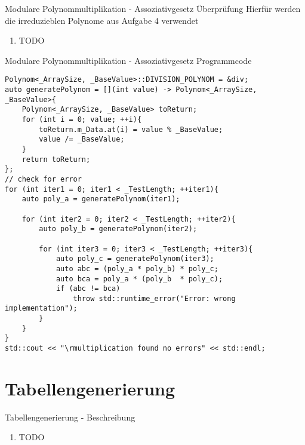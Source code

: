 \documentclass{beamer}
\begin{document}
    \begin{frame}{Modulare Polynommultiplikation - \newline Assoziativgesetz Überprüfung}
	    Hierfür werden die irreduzieblen Polynome aus Aufgabe 4 verwendet
    	\begin{enumerate}
  	  	\item TODO
  	  	\end{enumerate}
    \end{frame}
    
    \begin{frame}[fragile]{Modulare Polynommultiplikation - \newline Assoziativgesetz Programmcode}
    	\begin{lstlisting}[style=numbers]
Polynom<_ArraySize, _BaseValue>::DIVISION_POLYNOM = &div;
auto generatePolynom = [](int value) -> Polynom<_ArraySize, _BaseValue>{
    Polynom<_ArraySize, _BaseValue> toReturn;
    for (int i = 0; value; ++i){
        toReturn.m_Data.at(i) = value % _BaseValue;
        value /= _BaseValue;
    }
    return toReturn;
};
// check for error
for (int iter1 = 0; iter1 < _TestLength; ++iter1){
    auto poly_a = generatePolynom(iter1);

    for (int iter2 = 0; iter2 < _TestLength; ++iter2){
        auto poly_b = generatePolynom(iter2);

        for (int iter3 = 0; iter3 < _TestLength; ++iter3){
            auto poly_c = generatePolynom(iter3);
            auto abc = (poly_a * poly_b) * poly_c;
            auto bca = poly_a * (poly_b  * poly_c);
            if (abc != bca)
                throw std::runtime_error("Error: wrong implementation");
        }
    }
}
std::cout << "\rmultiplication found no errors" << std::endl;
\end{lstlisting}
\end{frame}

	\section{Tabellengenerierung}
    \begin{frame}{Tabellengenerierung - \newline Beschreibung}
    	\begin{enumerate}
  	  	\item TODO
  	  	\end{enumerate}
    \end{frame}
    
\end{document}
